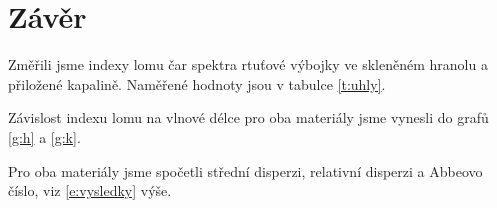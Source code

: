 \section*{Závěr}
Změřili jsme indexy lomu čar spektra rtuťové výbojky ve skleněném hranolu a přiložené kapalině. Naměřené hodnoty jsou v tabulce \ref{t:uhly}.

Závislost indexu lomu na vlnové délce pro oba materiály jsme vynesli do grafů \ref{g:h} a \ref{g:k}.

Pro oba materiály jsme spočetli střední disperzi, relativní disperzi a Abbeovo číslo, viz \eqref{e:vysledky} výše.